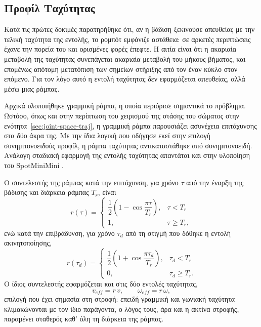 \documentclass[11pt]{report}
\begin{document}
\subsection{Προφίλ Ταχύτητας}
\label{subsec:velocity-ramp}
Κατά τις πρώτες δοκιμές παρατηρήθηκε ότι, αν η βάδιση ξεκινούσε απευθείας με την
τελική ταχύτητα της εντολής, το ρομπότ εμφάνιζε αστάθεια: σε αρκετές περιπτώσεις
έχανε την πορεία του και ορισμένες φορές έπεφτε. Η αιτία είναι ότι η ακαριαία
μεταβολή της ταχύτητας συνεπάγεται ακαριαία μεταβολή του μήκους βήματος, και
επομένως απότομη μετατόπιση των σημείων στήριξης από τον έναν κύκλο στον
επόμενο. Για τον λόγο αυτό η εντολή ταχύτητας δεν εφαρμόζεται απευθείας, αλλά
μέσω μιας ράμπας.

Αρχικά υλοποιήθηκε γραμμική ράμπα, η οποία περιόρισε σημαντικά το πρόβλημα.
Ωστόσο, όπως και στην περίπτωση του χειρισμού της στάσης του σώματος στην
ενότητα~\ref{sec:joint-space-traj}, η γραμμική ράμπα παρουσιάζει ασυνέχεια
επιτάχυνσης στα δύο άκρα της. Με την ίδια λογική που οδήγησε εκεί στην επιλογή
συνημιτονοειδούς προφίλ, η ράμπα ταχύτητας αντικαταστάθηκε από συνημιτονοειδή.
Ανάλογη σταδιακή εφαρμογή της εντολής ταχύτητας απαντάται και στην υλοποίηση
του SpotMiniMini \cite{spotminimini2020github}.

Ο συντελεστής της ράμπας κατά την επιτάχυνση, για χρόνο $\tau$ από την έναρξη
της βάδισης και διάρκεια ράμπας $T_r$, είναι
\begin{equation}
r(\tau) =
\begin{cases}
\dfrac{1}{2}\left(1 - \cos\dfrac{\pi \tau}{T_r}\right), & \tau < T_r \\[10pt]
1, & \tau \geq T_r,
\end{cases}
\label{eq:ramp-accel}
\end{equation}
ενώ κατά την επιβράδυνση, για χρόνο $\tau_d$ από τη στιγμή που δόθηκε η εντολή
ακινητοποίησης,
\begin{equation}
r(\tau_d) =
\begin{cases}
\dfrac{1}{2}\left(1 + \cos\dfrac{\pi \tau_d}{T_r}\right), & \tau_d < T_r \\[10pt]
0, & \tau_d \geq T_r.
\end{cases}
\label{eq:ramp-decel}
\end{equation}
Ο ίδιος συντελεστής εφαρμόζεται και στις δύο εντολές ταχύτητας,
\begin{equation}
v_{eff} = r\,v, \qquad \omega_{eff} = r\,\omega,
\label{eq:ramp-apply}
\end{equation}
επιλογή που έχει σημασία στη στροφή: επειδή γραμμική και γωνιακή ταχύτητα
κλιμακώνονται με τον ίδιο παράγοντα, ο λόγος τους, άρα και η ακτίνα στροφής,
παραμένει σταθερός καθ' όλη τη διάρκεια της ράμπας.
\end{document}
